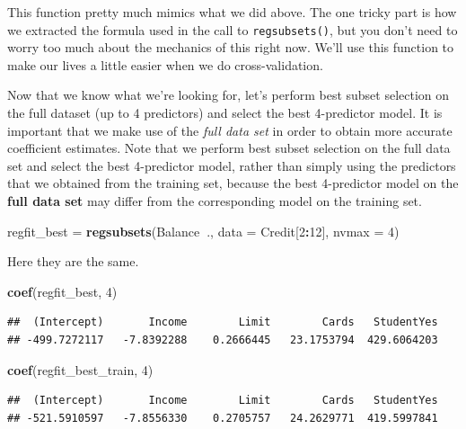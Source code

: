 \documentclass[
]{article}
\newenvironment{Shaded}{\begin{snugshade}}{\end{snugshade}}
\newcommand{\DataTypeTok}[1]{\textcolor[rgb]{0.13,0.29,0.53}{#1}}
\newcommand{\DecValTok}[1]{\textcolor[rgb]{0.00,0.00,0.81}{#1}}
\newcommand{\KeywordTok}[1]{\textcolor[rgb]{0.13,0.29,0.53}{\textbf{#1}}}
\newcommand{\NormalTok}[1]{#1}
\newcommand{\OperatorTok}[1]{\textcolor[rgb]{0.81,0.36,0.00}{\textbf{#1}}}
\newcommand{\StringTok}[1]{\textcolor[rgb]{0.31,0.60,0.02}{#1}}
\begin{document}
This function pretty much mimics what we did above. The one tricky part
is how we extracted the formula used in the call to
\texttt{regsubsets()}, but you don't need to worry too much about the
mechanics of this right now. We'll use this function to make our lives a
little easier when we do cross-validation.

Now that we know what we're looking for, let's perform best subset
selection on the full dataset (up to 4 predictors) and select the best
4-predictor model. It is important that we make use of the \emph{full
data set} in order to obtain more accurate coefficient estimates. Note
that we perform best subset selection on the full data set and select
the best 4-predictor model, rather than simply using the predictors that
we obtained from the training set, because the best 4-predictor model on
the \textbf{full data set} may differ from the corresponding model on
the training set.

\begin{Shaded}
\begin{Highlighting}[]
\NormalTok{regfit_best =}\StringTok{ }\KeywordTok{regsubsets}\NormalTok{(Balance}\OperatorTok{~}\NormalTok{., }\DataTypeTok{data =}\NormalTok{ Credit[}\DecValTok{2}\OperatorTok{:}\DecValTok{12}\NormalTok{], }\DataTypeTok{nvmax =} \DecValTok{4}\NormalTok{)}
\end{Highlighting}
\end{Shaded}

Here they are the same.

\begin{Shaded}
\begin{Highlighting}[]
\KeywordTok{coef}\NormalTok{(regfit_best, }\DecValTok{4}\NormalTok{)}
\end{Highlighting}
\end{Shaded}

\begin{verbatim}
##  (Intercept)       Income        Limit        Cards   StudentYes 
## -499.7272117   -7.8392288    0.2666445   23.1753794  429.6064203
\end{verbatim}

\begin{Shaded}
\begin{Highlighting}[]
\KeywordTok{coef}\NormalTok{(regfit_best_train, }\DecValTok{4}\NormalTok{)}
\end{Highlighting}
\end{Shaded}

\begin{verbatim}
##  (Intercept)       Income        Limit        Cards   StudentYes 
## -521.5910597   -7.8556330    0.2705757   24.2629771  419.5997841
\end{verbatim}
\end{document}
